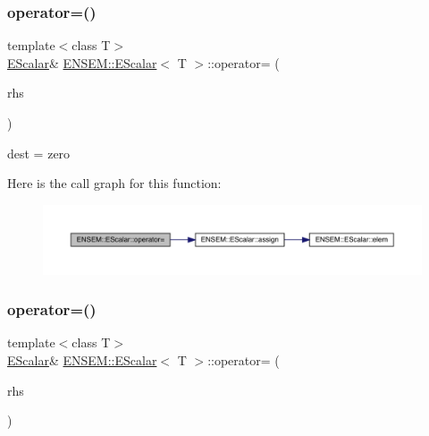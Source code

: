 \subsubsection{\texorpdfstring{operator=()}{operator=()}\hspace{0.1cm}{\footnotesize\ttfamily [6/12]}}
{\footnotesize\ttfamily template$<$class T$>$ \\
\mbox{\hyperlink{classENSEM_1_1EScalar}{E\+Scalar}}\& \mbox{\hyperlink{classENSEM_1_1EScalar}{E\+N\+S\+E\+M\+::\+E\+Scalar}}$<$ T $>$\+::operator= (\begin{DoxyParamCaption}\item[{const \mbox{\hyperlink{structENSEM_1_1Zero}{Zero}} \&}]{rhs }\end{DoxyParamCaption})\hspace{0.3cm}{\ttfamily [inline]}}



dest = zero 

Here is the call graph for this function\+:
\nopagebreak
\begin{figure}[H]
\begin{center}
\leavevmode
\includegraphics[width=350pt]{d0/d82/classENSEM_1_1EScalar_a9619fd24baf50fd03986c3056a484cb9_cgraph}
\end{center}
\end{figure}
\mbox{\label{classENSEM_1_1EScalar_ade0daedd37868c24651613bb6f499fd4}} 
\subsubsection{\texorpdfstring{operator=()}{operator=()}\hspace{0.1cm}{\footnotesize\ttfamily [7/12]}}
{\footnotesize\ttfamily template$<$class T$>$ \\
\mbox{\hyperlink{classENSEM_1_1EScalar}{E\+Scalar}}\& \mbox{\hyperlink{classENSEM_1_1EScalar}{E\+N\+S\+E\+M\+::\+E\+Scalar}}$<$ T $>$\+::operator= (\begin{DoxyParamCaption}\item[{const \mbox{\hyperlink{classENSEM_1_1EScalar}{E\+Scalar}}$<$ T $>$ \&}]{rhs }\end{DoxyParamCaption})\hspace{0.3cm}{\ttfamily [inline]}}




